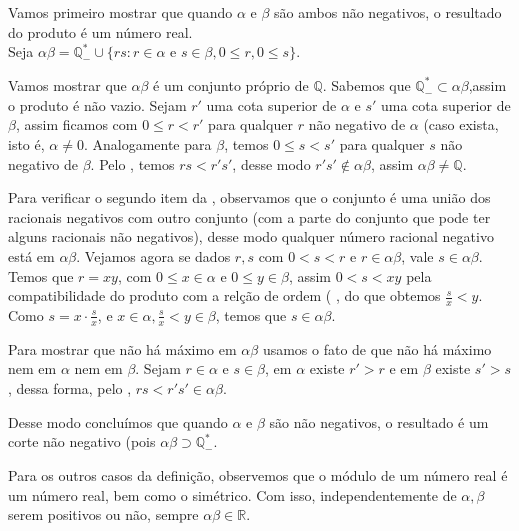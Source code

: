 \documentclass[../main.tex]{subfiles}
\begin{document}
\begin{dem}
    Vamos primeiro mostrar que quando $\alpha$ e $\beta$ são ambos não negativos, o resultado do produto é um número real. \\

    Seja $\alpha \beta = \mathbb{Q}^*_{-} \cup \{ rs : r \in \alpha \text{ e } s \in \beta, 0 \leq r, 0 \leq s \}$.
    
   
    Vamos mostrar que $\alpha\beta$ é um conjunto próprio de $\mathbb{Q}$. Sabemos que $\mathbb{Q}^*_{-} \subset \alpha \beta$,assim o produto é não vazio. Sejam $r'$ uma cota superior de $\alpha$ e $s'$ uma cota superior de $\beta$, assim ficamos com $0 \leq r < r'$ para qualquer $r$ não negativo de $\alpha$ (caso exista, isto é, $\alpha \neq 0$. Analogamente para $\beta$, temos $0 \leq s < s'$ para qualquer $s$ não negativo de $\beta$. Pelo , temos $rs < r's'$, desse modo $r's' \not\in \alpha \beta$, assim $\alpha \beta \neq \mathbb{Q}$.

    Para verificar o segundo item da , observamos que o conjunto é uma união dos racionais negativos com outro conjunto (com a parte do conjunto que pode ter alguns racionais não negativos), desse modo qualquer número racional negativo está em $\alpha \beta$. Vejamos agora se dados $r,s$ com $0 < s < r$ e $r \in \alpha \beta$, vale $s \in \alpha \beta$. Temos que $r = xy$, com $0 \leq x \in \alpha$ e $0 \leq y \in \beta$, assim $0 < s < xy$ pela compatibilidade do produto com a relção de ordem ( , 
    do que obtemos $\frac{s}{x} < y$. Como $s = x \cdot \frac{s}{x}$, e $x \in \alpha, \frac{s}{x} < y \in \beta$, temos que $s \in \alpha \beta$.    

    Para mostrar que não há máximo em $\alpha \beta$ usamos o fato de que não há máximo nem em $\alpha$ nem em $\beta$. Sejam $r \in \alpha$ e $s \in \beta$, em $\alpha$ existe $r' > r$ e em $\beta$ existe $s' > s$, dessa forma, pelo ,  $rs < r's'  \in \alpha \beta$.

    Desse modo concluímos que quando $\alpha$ e $\beta$ são não negativos, o resultado é um corte não negativo (pois $\alpha\beta \supset \mathbb{Q}_{-}^*$.

    Para os outros casos da definição, observemos que o módulo de um número real é um número real, bem como o simétrico. Com isso, independentemente de $\alpha, \beta$ serem positivos ou não, sempre $\alpha\beta \in \mathbb{R}$.
    
\end{dem}
\end{document}

